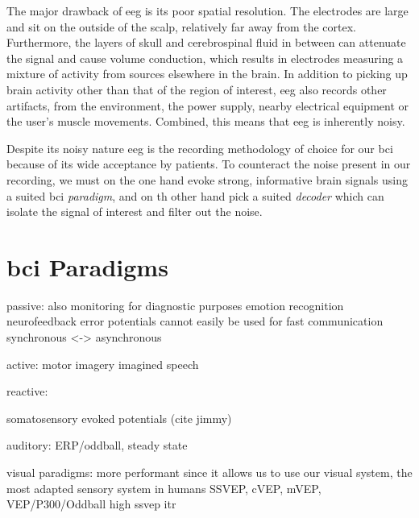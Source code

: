 The major drawback of \ac{eeg} is its poor spatial resolution.
The electrodes are large and sit on the outside of the scalp, relatively far
away from the cortex.
Furthermore, the layers of skull and cerebrospinal fluid in between can
attenuate the signal and cause volume conduction, which results in electrodes
measuring a mixture of activity from sources elsewhere in the brain.
In addition to picking up brain activity other than that of the region of
interest, \ac{eeg} also records other artifacts, from the
environment, the power supply, nearby electrical equipment or the user's muscle
movements.
Combined, this means that \ac{eeg} is inherently noisy.

Despite its noisy nature \Ac{eeg} is the recording methodology of choice for
our \ac{bci} because of its wide acceptance by patients.
To counteract the noise present in our recording, we must on the one hand evoke
strong, informative brain signals using a suited \ac{bci} \emph{paradigm}, and on th
other hand pick a suited \emph{decoder} which can isolate the signal of
interest and filter out the noise.

\section{\ac{bci} Paradigms}
\label{sec:bci-paradigms}
passive:
also monitoring for diagnostic purposes
emotion recognition
neurofeedback
error potentials
cannot easily be used for fast communication
synchronous <-> asynchronous

\cite{Xu2021}

active:
motor imagery
imagined speech

reactive:

somatosensory evoked potentials (cite jimmy)

auditory:
ERP/oddball, steady state


visual paradigms:
more performant since it allows us to use our visual system, the most adapted
sensory system in humans
SSVEP, cVEP, mVEP, VEP/P300/Oddball
high ssvep itr

